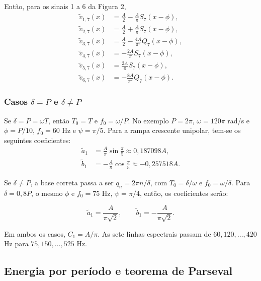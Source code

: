 Então, para os sinais 1 a 6 da Figura 2,
\begin{equation}
    \begin{aligned}
        \widetilde v_{1,7}(x)&=\frac A2-\frac A\pi S_7(x-\phi), \\
        \widetilde v_{2,7}(x)&=\frac A2+\frac A\pi S_7(x-\phi), \\
        \widetilde v_{3,7}(x)&=\frac A2-\frac{4A}{\pi^2}Q_7(x-\phi), \\
        \widetilde v_{4,7}(x)&=-\frac{2A}{\pi}S_7(x-\phi), \\
        \widetilde v_{5,7}(x)&=\frac{2A}{\pi}S_7(x-\phi), \\
        \widetilde v_{6,7}(x)&=-\frac{8A}{\pi^2}Q_7(x-\phi).
    \end{aligned}
\end{equation}

\subsubsection{Casos $\delta=P$ e $\delta\neq P$}
Se $\delta=P=\omega T$, então $T_0=T$ e $f_0=\omega/P$.
No exemplo $P=2\pi$, $\omega=120\pi$ rad/s e $\phi=P/10$,
$f_0=60$ Hz e $\psi=\pi/5$. Para a rampa crescente unipolar, tem-se os seguintes coeficientes:
\begin{equation}
    \begin{aligned}
        \widetilde a_1&=\frac A\pi\sin\frac\pi5\approx0{,}187098A, \\
        \widetilde b_1&=-\frac A\pi\cos\frac\pi5\approx-0{,}257518A.
    \end{aligned}
\end{equation}

Se $\delta\neq P$, a base correta passa a ser $q_n=2\pi n/\delta$,
com $T_0=\delta/\omega$ e $f_0=\omega/\delta$. Para
$\delta=0{,}8P$, o mesmo $\phi$ e $f_0=75$ Hz,
$\psi=\pi/4$, então, os coeficientes serão:

\begin{equation}
    \widetilde a_1=\frac{A}{\pi\sqrt2}, \qquad
    \widetilde b_1=-\frac{A}{\pi\sqrt2}.
\end{equation}

Em ambos os casos, $C_1=A/\pi$. As sete linhas espectrais passam de
$60,120,\ldots,420$ Hz para $75,150,\ldots,525$ Hz.


\subsection{Energia por período e teorema de Parseval}
